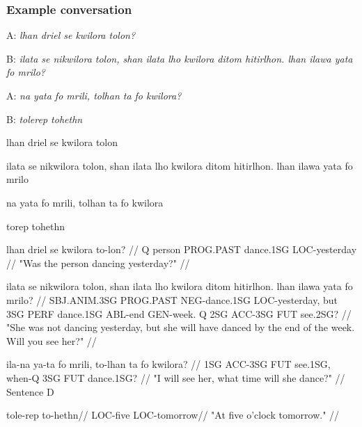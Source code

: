 \documentclass[letterpaper,twocolumn,openany,nodeprecatedcode,hidelinks]{dndbook}
\begin{document}
\subsubsection{Example conversation}

\noindent A: \textit{lhan driel se kwilora tolon?} %

\noindent B: \textit{ilata se nikwilora tolon, shan ilata lho kwilora ditom hitirlhon. lhan ilawa yata fo mrilo?} %

\noindent A: \textit{na yata fo mrili, tolhan ta fo kwilora?} %

\noindent B: \textit{tolerep tohethn} %

{\tovian
\noindent lhan driel se kwilora tolon

\noindent ilata se nikwilora tolon, shan ilata lho kwilora ditom hitirlhon. lhan ilawa yata fo mrilo

\noindent na yata fo mrili, tolhan ta fo kwilora

\noindent torep tohethn
}


\ex
\begingl
\gla lhan driel se kwilora to-lon? //
\glb Q person PROG.PAST dance.1SG LOC-yesterday // 
\glft "Was the person dancing yesterday?" //
\endgl
\xe

\ex
\begingl
\gla ilata se nikwilora tolon, shan ilata lho kwilora ditom hitirlhon. lhan ilawa yata fo mrilo? //
\glb SBJ.ANIM.3SG PROG.PAST NEG-dance.1SG LOC-yesterday, but 3SG PERF dance.1SG ABL-end GEN-week. Q 2SG ACC-3SG FUT see.2SG? //
\glft "She was not dancing yesterday, but she will have danced by the end of the week. Will you see her?" //
\endgl
\xe

\ex
\begingl
\gla ila-na ya-ta fo mrili, to-lhan ta fo kwilora? //
\glb 1SG ACC-3SG FUT see.1SG, when-Q 3SG FUT dance.1SG? //
\glft "I will see her, what time will she dance?" //
\endgl
\xe
Sentence D

\ex
\begingl
\gla tole-rep to-hethn//
\glb LOC-five LOC-tomorrow//
\glft "At five o'clock tomorrow." //
\endgl
\xe


\newpage



\end{document}
